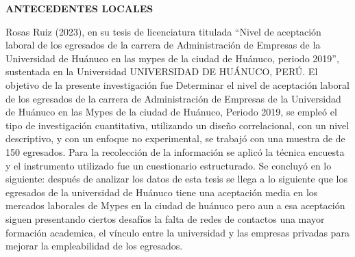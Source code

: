 \documentclass[12pt, a4paper]{article}
\begin{document}
\textbf{ANTECEDENTES LOCALES}

Rosas Ruiz (2023), en su tesis de licenciatura titulada “Nivel de aceptación laboral de los egresados de la carrera de Administración de Empresas de la Universidad de Huánuco en las mypes de la ciudad de Huánuco, periodo 2019”, sustentada en la Universidad UNIVERSIDAD DE HUÁNUCO, PERÚ. El objetivo de la presente investigación fue Determinar el nivel de aceptación laboral de los egresados de la carrera de Administración de Empresas de la Universidad de Huánuco en las Mypes de la ciudad de Huánuco, Periodo 2019, se empleó el tipo de investigación cuantitativa, utilizando un diseño correlacional, con un nivel descriptivo, y con un enfoque no experimental, se trabajó con una muestra de de 150 egresados. Para la recolección de la información se aplicó la técnica encuesta y el instrumento utilizado fue un cuestionario estructurado. 
Se concluyó en lo siguiente: después de analizar los datos de esta tesis se llega a lo siguiente que los egresados de la universidad de Huánuco tiene una aceptación media en los mercados laborales de Mypes en la ciudad de huánuco pero aun a esa aceptación siguen presentando ciertos desafíos la falta de redes de contactos una mayor formación academica, el vínculo entre la universidad y las empresas privadas para mejorar la empleabilidad de los egresados.
\end{document}
